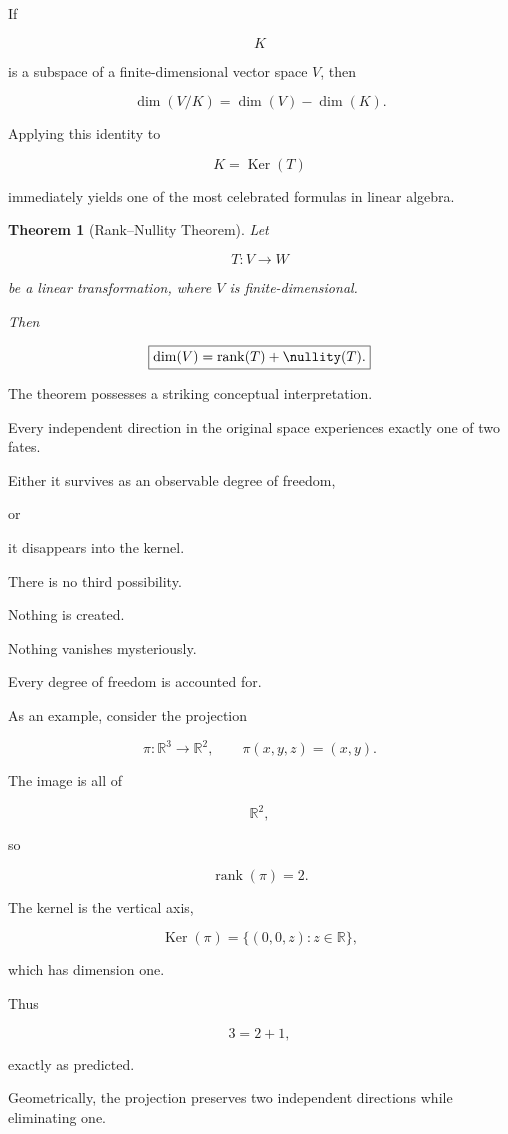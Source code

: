 \documentclass[11pt]{book}
\numberwithin{equation}{chapter}
\theoremstyle{definition}
\theoremstyle{plain}
\newtheorem{theorem}[definition]{Theorem}
\theoremstyle{remark}
\DeclareMathOperator{\Ker}{Ker}
\DeclareMathOperator{\rank}{rank}
\begin{document}
If

\[
K
\]

is a subspace of a finite-dimensional vector space \(V\), then

\[
\dim(V/K)
=
\dim(V)-\dim(K).
\]

Applying this identity to

\[
K=\Ker(T)
\]

immediately yields one of the most celebrated formulas in linear algebra.

\begin{theorem}[Rank--Nullity Theorem]
Let

\[
T:V\rightarrow W
\]

be a linear transformation, where \(V\) is finite-dimensional.

Then

\[
\boxed{
\dim(V)
=
\rank(T)
+
\nullity(T).
}
\]

\end{theorem}

The theorem possesses a striking conceptual interpretation.

Every independent direction in the original space experiences exactly one of two fates.

Either it survives as an observable degree of freedom,

or

it disappears into the kernel.

There is no third possibility.

Nothing is created.

Nothing vanishes mysteriously.

Every degree of freedom is accounted for.

As an example, consider the projection

\[
\pi:\mathbb{R}^3
\rightarrow
\mathbb{R}^2,
\qquad
\pi(x,y,z)
=
(x,y).
\]

The image is all of

\[
\mathbb{R}^2,
\]

so

\[
\rank(\pi)=2.
\]

The kernel is the vertical axis,

\[
\Ker(\pi)
=
\{
(0,0,z)
:
z\in\mathbb{R}
\},
\]

which has dimension one.

Thus

\[
3
=
2
+
1,
\]

exactly as predicted.

Geometrically, the projection preserves two independent directions while eliminating one.
\end{document}
